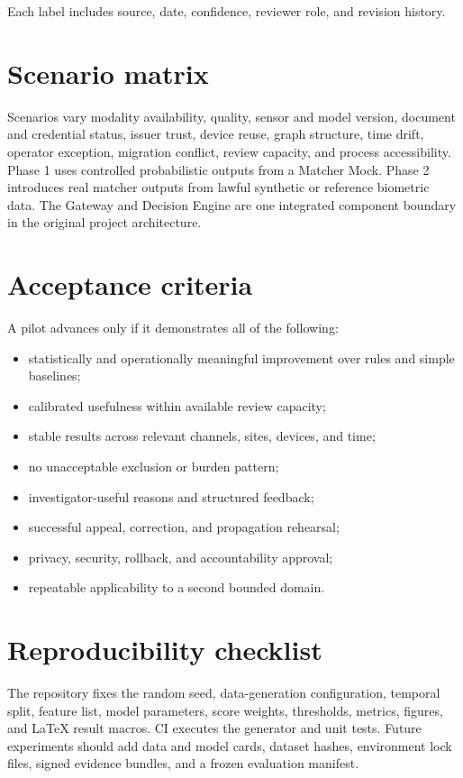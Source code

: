 Each label includes source, date, confidence, reviewer role, and revision history.

\section{Scenario matrix}

Scenarios vary modality availability, quality, sensor and model version, document and credential status, issuer trust, device reuse, graph structure, time drift, operator exception, migration conflict, review capacity, and process accessibility. Phase 1 uses controlled probabilistic outputs from a Matcher Mock. Phase 2 introduces real matcher outputs from lawful synthetic or reference biometric data. The Gateway and Decision Engine are one integrated component boundary in the original project architecture.

\section{Acceptance criteria}

A pilot advances only if it demonstrates all of the following:

\begin{itemize}
\item statistically and operationally meaningful improvement over rules and simple baselines;
\item calibrated usefulness within available review capacity;
\item stable results across relevant channels, sites, devices, and time;
\item no unacceptable exclusion or burden pattern;
\item investigator-useful reasons and structured feedback;
\item successful appeal, correction, and propagation rehearsal;
\item privacy, security, rollback, and accountability approval;
\item repeatable applicability to a second bounded domain.
\end{itemize}

\section{Reproducibility checklist}

The repository fixes the random seed, data-generation configuration, temporal split, feature list, model parameters, score weights, thresholds, metrics, figures, and LaTeX result macros. CI executes the generator and unit tests. Future experiments should add data and model cards, dataset hashes, environment lock files, signed evidence bundles, and a frozen evaluation manifest.


